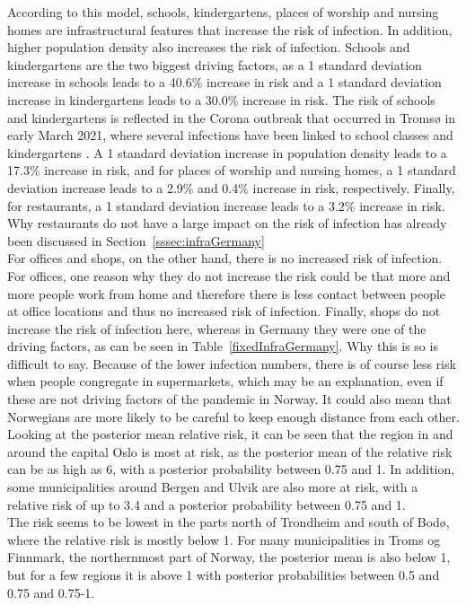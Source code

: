 According to this model, schools, kindergartens, places of worship and nursing homes are infrastructural features that increase the risk of infection. In addition, higher population density also increases the risk of infection. Schools and kindergartens are the two biggest driving factors, as a 1 standard deviation increase in schools leads to a 40.6\% increase in risk and a 1 standard deviation increase in kindergartens leads to a 30.0\% increase in risk. The risk of schools and kindergartens is reflected in the Corona outbreak that occurred in Tromsø in early March 2021, where several infections have been linked to school classes and kindergartens \cite{tromsokorona}. A 1 standard deviation increase in population density leads to a 17.3\% increase in risk, and for places of worship and nursing homes, a 1 standard deviation increase leads to a 2.9\% and 0.4\% increase in risk, respectively. Finally, for restaurants, a 1 standard deviation increase leads to a 3.2\% increase in risk. Why restaurants do not have a large impact on the risk of infection has already been discussed in Section~\ref{sssec:infraGermany}
\\
For offices and shops, on the other hand, there is no increased risk of infection. For offices, one reason why they do not increase the risk could be that more and more people work from home and therefore there is less contact between people at office locations and thus no increased risk of infection. Finally, shops do not increase the risk of infection here, whereas in Germany they were one of the driving factors, as can be seen in Table~\ref{fixedInfraGermany}. Why this is so is difficult to say. Because of the lower infection numbers, there is of course less risk when people congregate in supermarkets, which may be an explanation, even if these are not driving factors of the pandemic in Norway. It could also mean that Norwegians are more likely to be careful to keep enough distance from each other. \\
Looking at the posterior mean relative risk, it can be seen that the region in and around the capital Oslo is most at risk, as the posterior mean of the relative risk can be as high as 6, with a posterior probability between 0.75 and 1. In addition, some municipalities around Bergen and Ulvik are also more at risk, with a relative risk of up to 3.4 and a posterior probability between 0.75 and 1. \\
The risk seems to be lowest in the parts north of Trondheim and south of Bodø, where the relative risk is mostly below 1. For many municipalities in Troms og Finnmark, the northernmost part of Norway, the posterior mean is also below 1, but for a few regions it is above 1 with posterior probabilities between 0.5 and 0.75 and 0.75-1.
